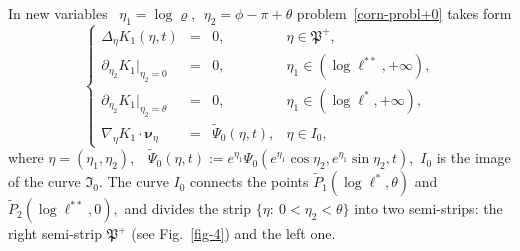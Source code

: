 \documentclass[reqno]{amsart}            %
\numberwithin{equation}{section}
\begin{document}
	In new variables \ $\eta_1 = \log \varrho, \ \ \eta_2 = \phi - \pi + \theta$ problem~\eqref{corn-probl+0} takes form  
	\begin{equation}\label{strip-probl+0}
		\left\{
		\begin{array}{rcll}
			\Delta_\eta {K}_1(\eta,t) &=& 0,
			& \eta\in \mathfrak{P}^+,
			\\[2mm]
			\partial_{\eta_2}{K}_1|_{\eta_2 = 0}  &=& 0, & \eta_1 \in (\log \ell^{**}, +\infty),
			\\[2mm]
			\partial_{\eta_2}{K}_1|_{\eta_2 = \theta} &=& 0, & \eta_1 \in (\log \ell^{*}, +\infty),
			\\[2mm]
			\nabla_\eta{K}_1 \cdot \boldsymbol{\nu}_\eta &=& \widetilde{\varPsi}_0(\eta,t), & \eta \in I_0,
		\end{array}
		\right.
	\end{equation}
	where $\eta = (\eta_1, \eta_2),$ \ $\widetilde{\varPsi}_0(\eta,t) := e^{\eta_1} \varPsi_0(e^{\eta_1} \cos\eta_2, e^{\eta_1} \sin\eta_2,t),$
	${I}_0$ is the image of the curve $\mathfrak{I}_0.$ The curve ${I}_0$ connects the points $\widetilde{P}_1(\log \ell^{*}, \theta)$ and $\widetilde{P}_2(\log \ell^{**}, 0),$ and divides the strip $\{\eta\colon \ 0  < \eta_2 < \theta\}$ into two semi-strips: the right semi-strip $\mathfrak{P}^+$ (see Fig.~\ref{fig-4}) and the left one.
	
\end{document}
